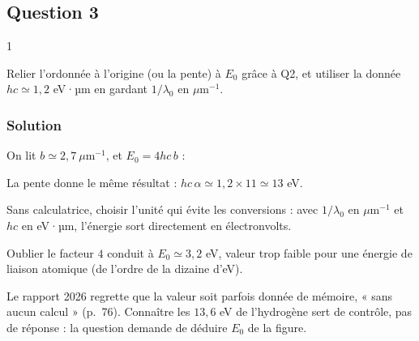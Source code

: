 \documentclass[11pt,a4paper]{article}
\newcommand{\equationajustee}[1]{%
  \sbox{\boiteequation}{$\displaystyle #1$}%
  \ifdim\wd\boiteequation>\linewidth
    \[\resizebox{\linewidth}{!}{\usebox{\boiteequation}}\]%
  \else
    \[#1\]%
  \fi}
\begin{document}
\hypertarget{question-3}{%
\subsection{Question 3}\label{question-3}}

\begin{indication}{1}

Relier l'ordonnée à l'origine (ou la pente) à \(E_0\) grâce à Q2, et utiliser la donnée \(hc\simeq1{,}2\) eV·µm en gardant \(1/\lambda_0\) en \(\mu\text{m}^{-1}\).

\end{indication}

\hypertarget{solution-2}{%
\subsubsection{Solution}\label{solution-2}}

On lit \(b\simeq2{,}7\ \mu\text{m}^{-1}\), et \(E_0=4hc\,b\) :

\equationajustee{E_0\simeq4\times1{,}2\times2{,}7\ \text{eV}}

\equationajustee{\boxed{E_0\simeq13\ \text{eV}}}

La pente donne le même résultat : \(hc\,\alpha\simeq1{,}2\times11\simeq13\) eV.

\begin{methode}

Sans calculatrice, choisir l'unité qui évite les conversions : avec \(1/\lambda_0\) en \(\mu\text{m}^{-1}\) et \(hc\) en eV·µm, l'énergie sort directement en électronvolts.

\end{methode}

\begin{piege}

Oublier le facteur \(4\) conduit à \(E_0\simeq3{,}2\) eV, valeur trop faible pour une énergie de liaison atomique (de l'ordre de la dizaine d'eV).

\end{piege}

\begin{jury}

Le rapport 2026 regrette que la valeur soit parfois donnée de mémoire, « sans aucun calcul » (p.~76). Connaître les \(13{,}6\) eV de l'hydrogène sert de contrôle, pas de réponse : la question demande de déduire \(E_0\) de la figure.

\end{jury}
\end{document}
